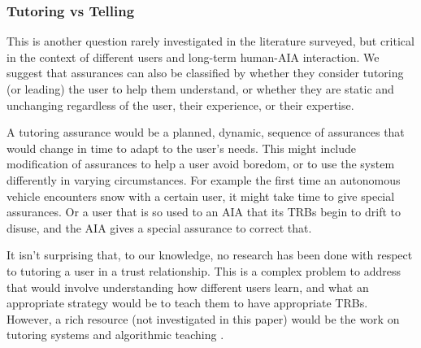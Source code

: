 \subsubsection{Tutoring vs Telling} \label{sec:teach_tell}
This is another question rarely investigated in the literature surveyed, but critical in the context of different users and long-term human-AIA interaction. We suggest that assurances can also be classified by whether they consider tutoring (or leading) the user to help them understand, or whether they are static and unchanging regardless of the user, their experience, or their expertise.

A tutoring assurance would be a planned, dynamic, sequence of assurances that would change in time to adapt to the user's needs. This might include modification of assurances to help a user avoid boredom, or to use the system differently in varying circumstances. For example the first time an autonomous vehicle encounters snow with a certain user, it might take time to give special assurances. Or a user that is so used to an AIA that its TRBs begin to drift to disuse, and the AIA gives a special assurance to correct that.

It isn't surprising that, to our knowledge, no research has been done with respect to tutoring a user in a trust relationship. This is a complex problem to address that would involve understanding how different users learn, and what an appropriate strategy would be to teach them to have appropriate TRBs. However, a rich resource (not investigated in this paper) would be the work on tutoring systems \citet{Wenger2014-ld} and algorithmic teaching \citet{Balbach2009-jw}.
